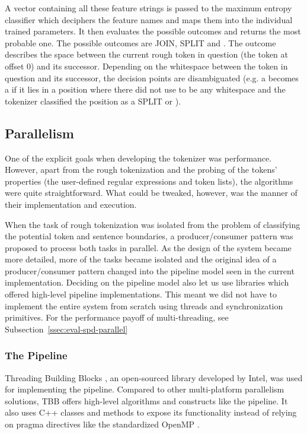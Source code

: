 A vector containing all these feature strings is passed to the maximum entropy
classifier which deciphers the feature names and maps them into the individual
trained parameters. It then evaluates the possible outcomes and returns the
most probable one. The possible outcomes are JOIN, SPLIT and \breaksentence{}.
The outcome describes the space between the current rough token in question
(the token at offset 0) and its successor. Depending on the whitespace between
the token in question and its successor, the decision points are disambiguated
(e.g. a \maysplit{} becomes a \dosplit{} if it lies in a position where there
did not use to be any whitespace and the tokenizer classified the position as a
SPLIT or \breaksentence{}).


\subsection{Parallelism}
\label{sec:impl-parallel}

One of the explicit goals when developing the tokenizer was performance.
However, apart from the rough tokenization and the probing of the tokens'
properties (the user-defined regular expressions and token lists), the
algorithms were quite straightforward. What could be tweaked, however, was the
manner of their implementation and execution. 

When the task of rough tokenization was isolated from the problem of
classifying the potential token and sentence boundaries, a producer/consumer
pattern was proposed to process both tasks in parallel. As the design of the
system became more detailed, more of the tasks became isolated and the original
idea of a producer/consumer pattern changed into the pipeline model seen in the
current implementation. Deciding on the pipeline model also let us use
libraries which offered high-level pipeline implementations. This meant we did
not have to implement the entire system from scratch using threads and
synchronization primitives. For the performance payoff of multi-threading, see
Subsection~\ref{ssec:eval-spd-parallel}

\subsubsection{The Pipeline}
\label{ssec:impl-parallel-pipeline}

Threading Building Blocks \cite{web-tbb}, an open-sourced library developed by
Intel, was used for implementing the pipeline. Compared to other multi-platform
parallelism solutions, TBB offers high-level algorithms and constructs like the
pipeline. It also uses C++ classes and methods to expose its functionality
instead of relying on pragma directives like the standardized OpenMP
\cite{web-openmp}. 

